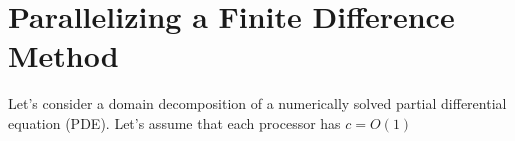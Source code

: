 \section{Parallelizing a Finite Difference Method}
\begin{comment}
\begin{tikzpicture}
\draw (-1.5,0) -- (1.5,0);
\draw (0,-1.5) -- (0,1.5);
\end{tikzpicture}.

\begin{tikzpicture}
\begin{scope}[every node/.style={circle,thick,draw}]
    \node (A) at (0,0) {A};
    \node (B) at (0,3) {B};
    \node (C) at (2.5,4) {C};
    \node (D) at (2.5,1) {D};
    \node (E) at (2.5,-3) {E};
    \node (F) at (5,3) {F} ;
\end{scope}

\begin{scope}[>={stealth[black]},
              every node/.style={fill=white,circle},
              every edge/.style={draw=red,very thick}]
    \path [->] (A) edge node {$5$} (B);
    \path [->] (B) edge node {$3$} (C);
    \path [->] (A) edge node {$4$} (D);
    \path [->] (D) edge node {$3$} (C);
    \path [->] (A) edge node {$3$} (E);
    \path [->] (D) edge node {$3$} (E);
    \path [->] (D) edge node {$3$} (F);
    \path [->] (C) edge node {$5$} (F);
    \path [->] (E) edge node {$8$} (F); 
    \path [->] (B) edge[bend right=60] node {$1$} (E); 
\end{scope}
\end{tikzpicture}

\begin{tikzpicture}[
  thick,
  myrect/.style={
    draw,
    fill=myyellow,
    rectangle split,
    rectangle split parts=#1,
    rectangle split part align=left
    },
  myrect2/.style={
    draw,
    fill=myyellow,
    rectangle split,
    rectangle split draw splits=false,
    rectangle split part align=left
    },  
  mycallout/.style={
    shape=rectangle callout,
    rounded corners,
    fill=mysalmon,
    callout absolute pointer={#1},
    callout pointer width=1cm
  }  
]
\node[myrect=6,text width=1em,align=center]
  (numbers)
  {
  \strut 2
  \nodepart{two}\strut 1
  \nodepart{three}\strut 3
  \nodepart{four}\strut 3
  \nodepart{five}\strut 2
  \nodepart{six}\strut 0
  };
\end{tikzpicture}
\end{comment}
Let's consider a domain decomposition of a numerically solved partial
differential equation (PDE). Let's assume that each processor has $c = O(1)$
